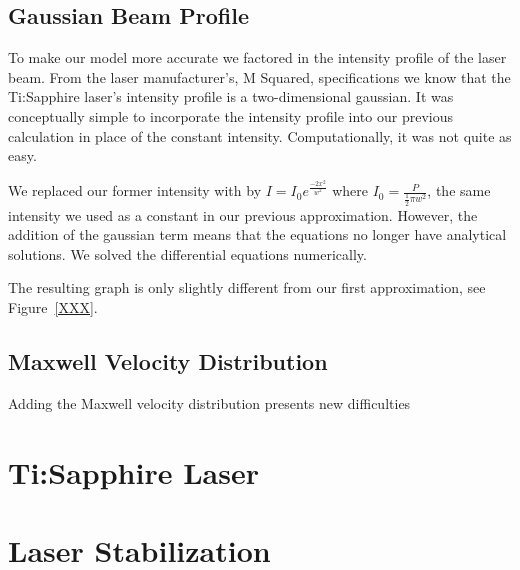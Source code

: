 \documentclass[prb,preprint]{revtex4-1}
\begin{document}
\subsection{Gaussian Beam Profile}

To make our model more accurate we factored in the intensity profile of the laser beam. From the laser manufacturer's, M Squared, specifications we know that the Ti:Sapphire laser's intensity profile is a two-dimensional gaussian. It was conceptually simple to incorporate the intensity profile into our previous calculation in place of the constant intensity. Computationally, it was not quite as easy.

We replaced our former intensity with by $I = I_0 e^{\frac{-2 x^2}{w^2}}$ where $I_0 = \frac{P}{\frac{1}{2}\pi w^2}$, the same intensity we used as a constant in our previous approximation. However, the addition of the gaussian term means that the equations no longer have analytical solutions. We solved the differential equations numerically.

The resulting graph is only slightly different from our first approximation, see Figure~\ref{XXX}.

\subsection{Maxwell Velocity Distribution}

Adding the Maxwell velocity distribution presents new difficulties 
 
 

\section{Ti:Sapphire Laser}


\section{Laser Stabilization}



\begin{thebibliography}{0}



\end{thebibliography}
\end{document}
